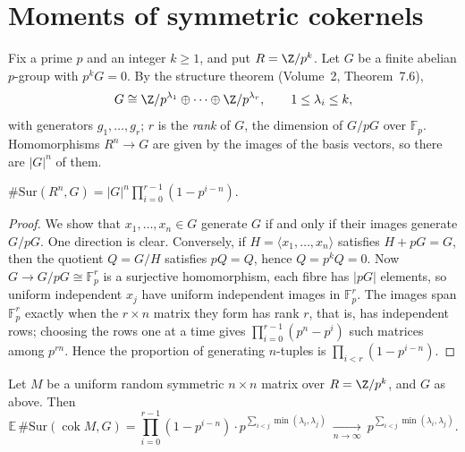 \section{Moments of symmetric cokernels}

Fix a prime $p$ and an integer $k\ge1$, and put $R=\Z/p^k$. Let $G$ be a finite abelian $p$-group with $p^kG=0$. By the structure theorem (Volume~2, Theorem~7.6),
\[
G\cong\Z/p^{\lambda_1}\oplus\dots\oplus\Z/p^{\lambda_r},\qquad1\le\lambda_i\le k,
\]
with generators $g_1,\dots,g_r$; $r$ is the \emph{rank} of $G$, the dimension of $G/pG$ over $\mathbb F_p$. Homomorphisms $R^n\to G$ are given by the images of the basis vectors, so there are $|G|^n$ of them.

\begin{lemma}\label{lem:countsur}
$\#\mathrm{Sur}(R^n,G)=|G|^n\prod_{i=0}^{r-1}(1-p^{i-n})$.
\end{lemma}

\begin{proof}
We show that $x_1,\dots,x_n\in G$ generate $G$ if and only if their images generate $G/pG$. One direction is clear. Conversely, if $H=\langle x_1,\dots,x_n\rangle$ satisfies $H+pG=G$, then the quotient $Q=G/H$ satisfies $pQ=Q$, hence $Q=p^kQ=0$. Now $G\to G/pG\cong\mathbb F_p^r$ is a surjective homomorphism, each fibre has $|pG|$ elements, so uniform independent $x_j$ have uniform independent images in $\mathbb F_p^r$. The images span $\mathbb F_p^r$ exactly when the $r\times n$ matrix they form has rank $r$, that is, has independent rows; choosing the rows one at a time gives $\prod_{i=0}^{r-1}(p^n-p^i)$ such matrices among $p^{rn}$. Hence the proportion of generating $n$-tuples is $\prod_{i<r}(1-p^{i-n})$.
\end{proof}

\begin{theorem}\label{thm:symmoments}
Let $M$ be a uniform random symmetric $n\times n$ matrix over $R=\Z/p^k$, and $G$ as above. Then
\[
\mathbb E\,\#\mathrm{Sur}(\operatorname{cok}M,G)=\prod_{i=0}^{r-1}(1-p^{i-n})\cdot p^{\sum_{i<j}\min(\lambda_i,\lambda_j)}
\ \xrightarrow[n\to\infty]{}\ p^{\sum_{i<j}\min(\lambda_i,\lambda_j)}.
\]
\end{theorem}

